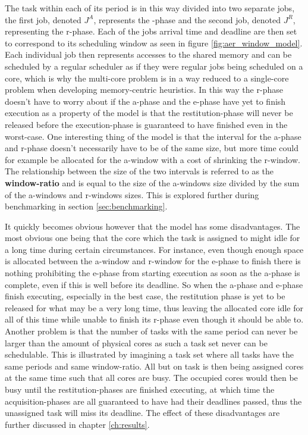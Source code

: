 \documentclass{kththesis}
\begin{document}
The task within each of its period is in this way divided into two separate jobs, the first job,
denoted $J^{A}$, represents the -phase and the second job, denoted $J^{R}$, representing
the \acrshort{r}-phase. Each of the jobs arrival time and deadline are then set to correspond to its
scheduling window as seen in figure \ref{fig:aer_window_model}. Each individual job then represents
accesses to the shared memory and can be scheduled by a regular scheduler as if they were regular
jobs being scheduled on a core, which is why the multi-core problem is in a way reduced to a
single-core problem when developing memory-centric heuristics. In this way the \acrshort{r}-phase
doesn't have to worry about if the \acrshort{a}-phase and the \acrshort{e}-phase have yet to finish
execution as a property of the model is that the restitution-phase will never be released before the
execution-phase is guaranteed to have finished even in the worst-case. One interesting thing of the
model is that the interval for the \acrshort{a}-phase and \acrshort{r}-phase doesn't necessarily
have to be of the same size, but more time could for example be allocated for the
\acrshort{a}-window with a cost of shrinking the \acrshort{r}-window. The relationship between the
size of the two intervals is referred to as the \textbf{window-ratio} and is equal to the size of
the \acrshort{a}-windows size divided by the sum of the \acrshort{a}-windows and
\acrshort{r}-windows sizes. This is explored further during benchmarking in section
\ref{sec:benchmarking}.

It quickly becomes obvious however that the model has some disadvantages. The most obvious one being
that the core which the task is assigned to might idle for a long time during certain circumstances.
For instance, even though enough space is allocated between the \acrshort{a}-window and
\acrshort{r}-window for the \acrshort{e}-phase to finish there is nothing prohibiting the
\acrshort{e}-phase from starting execution as soon as the \acrshort{a}-phase is complete, even if
this is well before its deadline. So when the \acrshort{a}-phase and \acrshort{e}-phase finish
executing, especially in the best case, the restitution phase is yet to be released for what may be
a very long time, thus leaving the allocated core idle for all of this time while unable to finish
its \acrshort{r}-phase even though it should be able to. Another problem is that the number of tasks
with the same period can never be larger than the amount of physical cores as such a task set never
can be schedulable. This is illustrated by imagining a task set where all tasks have the same
periods and same window-ratio. All but on task is then being assigned cores at the same time such
that all cores are busy. The occupied cores would then be busy until the restitution-phases are
finished executing, at which time the acquisition-phases are all guaranteed to have had their
deadlines passed, thus the unassigned task will miss its deadline. The effect of these disadvantages
are further discussed in chapter \ref{ch:results}.
\end{document}
